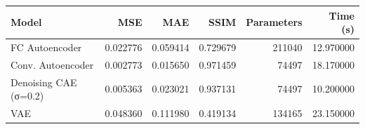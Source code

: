 \begin{tabular}{lrrrrr}
\toprule
Model & MSE & MAE & SSIM & Parameters & Time (s) \\
\midrule
FC Autoencoder & 0.022776 & 0.059414 & 0.729679 & 211040 & 12.970000 \\
Conv. Autoencoder & 0.002773 & 0.015650 & 0.971459 & 74497 & 18.170000 \\
Denoising CAE (σ=0.2) & 0.005363 & 0.023021 & 0.937131 & 74497 & 10.200000 \\
VAE & 0.048360 & 0.111980 & 0.419134 & 134165 & 23.150000 \\
\bottomrule
\end{tabular}
